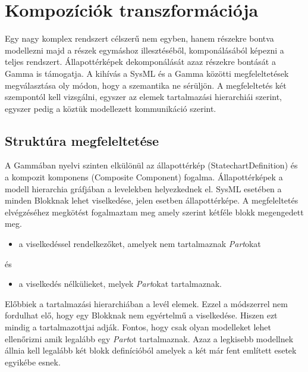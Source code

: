 \newpage
\section{Kompozíciók transzformációja}

Egy nagy komplex rendszert célszerű nem egyben, hanem részekre bontva modellezni majd a részek egymáshoz illesztéséből, komponálásából képezni a teljes rendszert. Állapottérképek dekomponálását azaz részekre bontását a Gamma is támogatja. A kihívás a SysML és a Gamma közötti megfeleltetések megválasztása oly módon, hogy a szemantika ne sérüljön. A megfeleltetés két szempontól kell vizsgálni, egyszer az elemek tartalmazási hierarchiái szerint, egyszer pedig a köztük modellezett kommunikáció szerint.

\subsection{Struktúra megfeleltetése}
A Gammában nyelvi szinten elkülönül az állapottérkép (StatechartDefinition) és a kompozit komponens (Composite Component) fogalma. Állapottérképek a modell hierarchia gráfjában a levelekben helyezkednek el. SysML esetében a minden Blokknak lehet viselkedése, jelen esetben állapottérképe. A megfeleltetés elvégzéséhez megkötést fogalmaztam meg amely szerint kétféle blokk megengedett meg.\\
\begin{itemize}
	\item a viselkedéssel rendelkezőket, amelyek nem tartalmaznak \emph{Part}okat
\end{itemize}
és
\begin{itemize}
	\item a viselkedés nélkülieket, melyek \emph{Part}okat tartalmaznak.\\
\end{itemize}
Előbbiek a tartalmazási hierarchiában a levél elemek. Ezzel a módszerrel nem fordulhat elő, hogy egy Blokknak nem egyértelmű a viselkedése. Hiszen ezt mindig a tartalmazottjai adják. Fontos, hogy csak olyan modelleket lehet ellenőrizni amik legalább egy \emph{Part}ot tartalmaznak. Azaz a legkisebb modellnek állnia kell legalább két blokk definícióból amelyek a két már fent említett esetek egyikébe esnek.

